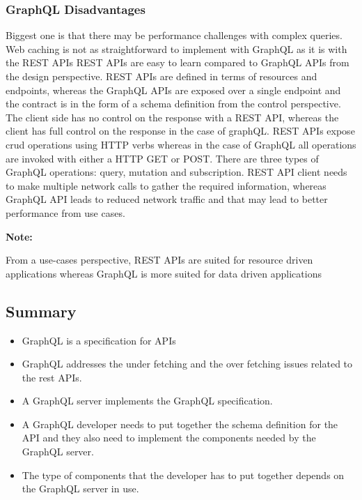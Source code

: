 \documentclass[a4paper, 11pt]{book}
\newenvironment{note}{
    \begin{siderule}
        \textbf{Note: }
        }{
    \end{siderule}
}
\begin{document}
    \subsubsection{GraphQL Disadvantages}
    Biggest one is that there may be performance challenges with complex queries.
    Web caching is not as straightforward to implement with GraphQL as it is with the REST APIs
    REST APIs are easy to learn compared to GraphQL APIs from the design perspective.
    REST APIs are defined in terms of resources and endpoints, whereas the GraphQL APIs are exposed over a single endpoint and the contract is in the form of a schema definition from the control perspective.
    The client side has no control on the response with a REST API, whereas the client has full control on the response in the case of graphQL.
    REST APIs expose crud operations using HTTP verbs whereas in the case of GraphQL all operations are invoked with either a HTTP GET or POST.
    There are three types of GraphQL operations: query, mutation and subscription.
    REST API client needs to make multiple network calls to gather the required information, whereas GraphQL API leads to reduced network traffic and that may lead to better performance from use cases.

    \begin{note}
        From a use-cases perspective, REST APIs are suited for resource driven applications whereas GraphQL is more suited for data driven applications %
    \end{note}

    \subsection{Summary}

    \begin{itemize}
        \item GraphQL is a specification for APIs
        \item GraphQL addresses the under fetching and the over fetching issues related to the rest APIs.
        \item A GraphQL server implements the GraphQL specification.
        \item A GraphQL developer needs to put together the schema definition for the API and they also need to implement the components needed by the GraphQL server.
        \item The type of components that the developer has to put together depends on the GraphQL server in use.
    \end{itemize}
\end{document}
